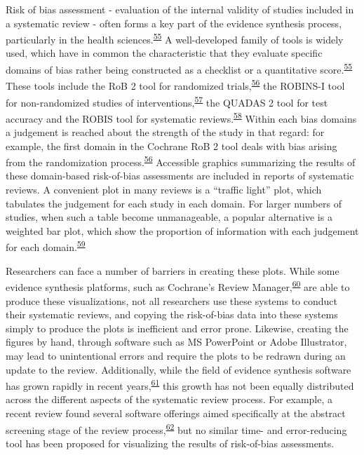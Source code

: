 \documentclass[a4paper, twoside]{templates/ociamthesis}
\begin{document}
Risk of bias assessment - evaluation of the internal validity of studies included in a systematic review - often forms a key part of the evidence synthesis process, particularly in the health sciences.\textsuperscript{\protect\hyperlink{ref-cochranechpt7}{55}} A well-developed family of tools is widely used, which have in common the characteristic that they evaluate specific domains of bias rather being constructed as a checklist or a quantitative score.\textsuperscript{\protect\hyperlink{ref-cochranechpt7}{55}} These tools include the RoB 2 tool for randomized trials,\textsuperscript{\protect\hyperlink{ref-sterne2019rob}{56}} the ROBINS-I tool for non-randomized studies of interventions,\textsuperscript{\protect\hyperlink{ref-sterne2016robins}{57}} the QUADAS 2 tool for test accuracy and the ROBIS tool for systematic reviews.\textsuperscript{\protect\hyperlink{ref-whiting2011quadas}{58}} Within each bias domains a judgement is reached about the strength of the study in that regard: for example, the first domain in the Cochrane RoB 2 tool deals with bias arising from the randomization process.\textsuperscript{\protect\hyperlink{ref-sterne2019rob}{56}} Accessible graphics summarizing the results of these domain-based risk-of-bias assessments are included in reports of systematic reviews. A convenient plot in many reviews is a ``traffic light'' plot, which tabulates the judgement for each study in each domain. For larger numbers of studies, when such a table become unmanageable, a popular alternative is a weighted bar plot, which show the proportion of information with each judgement for each domain.\textsuperscript{\protect\hyperlink{ref-higgins2008assessing}{59}}

Researchers can face a number of barriers in creating these plots. While some evidence synthesis platforms, such as Cochrane's Review Manager,\textsuperscript{\protect\hyperlink{ref-cochrane2014review}{60}} are able to produce these visualizations, not all researchers use these systems to conduct their systematic reviews, and copying the risk-of-bias data into these systems simply to produce the plots is inefficient and error prone. Likewise, creating the figures by hand, through software such as MS PowerPoint or Adobe Illustrator, may lead to unintentional errors and require the plots to be redrawn during an update to the review. Additionally, while the field of evidence synthesis software has grown rapidly in recent years,\textsuperscript{\protect\hyperlink{ref-marshall2015systematic}{61}} this growth has not been equally distributed across the different aspects of the systematic review process. For example, a recent review found several software offerings aimed specifically at the abstract screening stage of the review process,\textsuperscript{\protect\hyperlink{ref-harrison2020software}{62}} but no similar time- and error-reducing tool has been proposed for visualizing the results of risk-of-bias assessments.
\end{document}
